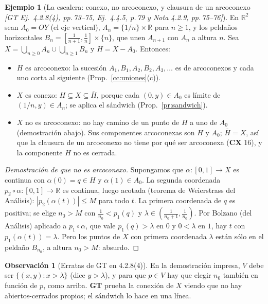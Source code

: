 \documentclass[11pt,a4paper]{article}
\newenvironment{lista}{\leavevmode\begin{itemize}[leftmargin=1.5em,itemsep=1pt,topsep=2pt,parsep=0pt]}{\end{itemize}}
\theoremstyle{definition}
\newtheorem{ejemplo}[definicion]{Ejemplo}
\newtheorem{observacion}[definicion]{Observación}
\theoremstyle{plain}
\newcommand{\fnt}[1]{{\normalfont\small\itshape\color{gray!150!black}[#1]}}
\newcommand{\R}{\mathbb{R}}
\newcommand{\cl}[1]{\overline{#1}}
\begin{document}
\begin{ejemplo}[La escalera: conexo, no arcoconexo, y clausura de un arcoconexo \fnt{GT Ej.\ 4.2.8(4), pp.\,73--75, Ej.\ 4.4.5, p.\,79 y Nota 4.2.9, pp.\,75--76}]\label{cc:escalera}
En $\R^2$ sean $A_0=OY$ (el eje vertical), $A_n=\{1/n\}\times\R$ para $n\ge1$, y los peldaños horizontales $B_n=[\frac1{n+1},\frac1n]\times\{n\}$, que unen $A_{n+1}$ con $A_n$ a altura $n$. Sea $X=\bigcup_{n\ge0}A_n\cup\bigcup_{n\ge1}B_n$ y $H=X-A_0$. Entonces:
\begin{lista}
\item $H$ es arcoconexo: la sucesión $A_1,B_1,A_2,B_2,A_3,\dots$ es de arcoconexos y cada uno corta al siguiente (Prop.~\ref{cc:uniones}(c)).
\item $X$ es conexo: $H\subseteq X\subseteq\cl H$, porque cada $(0,y)\in A_0$ es límite de $(1/n,y)\in A_n$; se aplica el sándwich (Prop.~\ref{pr:sandwich}).
\item $X$ no es arcoconexo: no hay camino de un punto de $H$ a uno de $A_0$ (demostración abajo). Sus componentes arcoconexas son $H$ y $A_0$; $\cl H=X$, así que la clausura de un arcoconexo no tiene por qué ser arcoconexa (\textbf{CX} 16), y la componente $H$ no es cerrada.
\end{lista}
\end{ejemplo}

\begin{proof}[Demostración de que no es arcoconexo]
Supongamos que $\alpha:[0,1]\to X$ es continua con $\alpha(0)=q\in H$ y $\alpha(1)\in A_0$. La segunda coordenada $p_2\circ\alpha:[0,1]\to\R$ es continua, luego acotada (teorema de Weierstrass del Análisis): $|p_2(\alpha(t))|\le M$ para todo $t$. La primera coordenada de $q$ es positiva; se elige $n_0>M$ con $\frac1{n_0}<p_1(q)$ y $\lambda\in(\frac1{n_0+1},\frac1{n_0})$. Por Bolzano (del Análisis) aplicado a $p_1\circ\alpha$, que vale $p_1(q)>\lambda$ en $0$ y $0<\lambda$ en $1$, hay $t$ con $p_1(\alpha(t))=\lambda$. Pero los puntos de $X$ con primera coordenada $\lambda$ están sólo en el peldaño $B_{n_0}$, a altura $n_0>M$: absurdo.
\end{proof}

\begin{observacion}[Erratas de GT en 4.2.8(4)]
En la demostración impresa, $V$ debe ser $\{(x,y): x>\lambda\}$ (dice $y>\lambda$), y para que $p\in V$ hay que elegir $n_0$ también en función de $p$, como arriba. \textbf{GT} prueba la conexión de $X$ viendo que no hay abiertos-cerrados propios; el sándwich lo hace en una línea.
\end{observacion}
\end{document}
